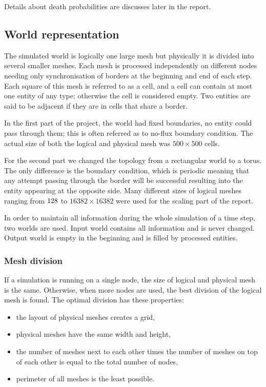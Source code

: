 \documentclass[a4paper]{article}
\begin{document}
Details about death probabilities are discusses later in the report.

\subsection{World representation}

The simulated world is logically one large mesh but physically it is divided into several smaller meshes.
Each mesh is processed independently on different nodes needing only synchronisation of borders at the beginning and end of each step.
Each square of this mesh is referred to as a cell, and a cell can contain at most one entity of any type; otherwise the cell is considered empty.
Two entities are said to be adjacent if they are in cells that share a border.

In the first part of the project, the world had fixed boundaries, no entity could pass through them; this is often referred as to no-flux boundary condition.
The actual size of both the logical and physical mesh was $500 \times 500$ cells.

For the second part we changed the topology from a rectangular world to a torus.
The only difference is the boundary condition, which is periodic meaning that any attempt passing through the border will be successful resulting into the entity appearing at the opposite side.
Many different sizes of logical meshes ranging from $128 \time 128$ to $16382 \times 16382$ were used for the scaling part of the report.

In order to maintain all information during the whole simulation of a time step, two worlds are used.
Input world contains all information and is never changed.
Output world is empty in the beginning and is filled by processed entities. 

\subsubsection{Mesh division}

If a simulation is running on a single node, the size of logical and physical mesh is the same.
Otherwise, when more nodes are used, the best division of the logical mesh is found.
The optimal division has these properties:
\begin{itemize}
\item the layout of physical meshes creates a grid,
\item physical meshes have the same width and height,
\item the number of meshes next to each other times the number of meshes on top of each other is equal to the total number of nodes,
\item perimeter of all meshes is the least possible.
\end{itemize}
\end{document}

